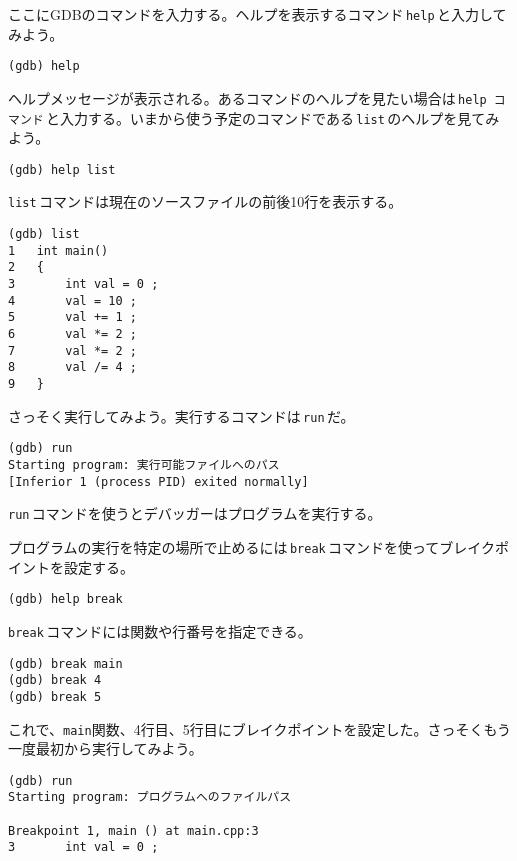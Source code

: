 ここにGDBのコマンドを入力する。ヘルプを表示するコマンド\,\texttt{help}\,と入力してみよう。

\begin{lstlisting}[style=terminal]
(gdb) help
\end{lstlisting}

ヘルプメッセージが表示される。あるコマンドのヘルプを見たい場合は\,\texttt{help コマンド}\,と入力する。いまから使う予定のコマンドである\,\texttt{list}\,のヘルプを見てみよう。

\begin{lstlisting}[style=terminal]
(gdb) help list
\end{lstlisting}

\texttt{list}\,コマンドは現在のソースファイルの前後10行を表示する。

\begin{lstlisting}[style=terminal]
(gdb) list
1   int main()
2   {
3       int val = 0 ;
4       val = 10 ;
5       val += 1 ;
6       val *= 2 ;
7       val *= 2 ;
8       val /= 4 ;
9   }
\end{lstlisting}

さっそく実行してみよう。実行するコマンドは\,\texttt{run}\,だ。

\begin{lstlisting}[style=terminal]
(gdb) run
Starting program: 実行可能ファイルへのパス
[Inferior 1 (process PID) exited normally]
\end{lstlisting}

\texttt{run}\,コマンドを使うとデバッガーはプログラムを実行する。

プログラムの実行を特定の場所で止めるには\,\texttt{break}\,コマンドを使ってブレイクポイントを設定する。

\begin{lstlisting}[style=terminal]
(gdb) help break
\end{lstlisting}

\texttt{break}\,コマンドには関数や行番号を指定できる。

\begin{lstlisting}[style=terminal]
(gdb) break main
(gdb) break 4
(gdb) break 5
\end{lstlisting}

これで、\texttt{main}関数、4行目、5行目にブレイクポイントを設定した。さっそくもう一度最初から実行してみよう。

\begin{lstlisting}[style=terminal]
(gdb) run
Starting program: プログラムへのファイルパス

Breakpoint 1, main () at main.cpp:3
3       int val = 0 ;
\end{lstlisting}

